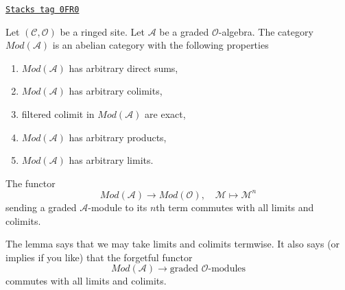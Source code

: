 \begin{lemma}[Gm abelian]
\label{sdga-lemma-gm-abelian}
\href{https://stacks.math.columbia.edu/tag/0FR0}{\texttt{Stacks tag 0FR0}}

Let $(\mathcal{C}, \mathcal{O})$ be a ringed site.
Let $\mathcal{A}$ be a graded $\mathcal{O}$-algebra.
The category $\textit{Mod}(\mathcal{A})$ is an abelian category
with the following properties
\begin{enumerate}
\item $\textit{Mod}(\mathcal{A})$ has arbitrary direct sums,
\item $\textit{Mod}(\mathcal{A})$ has arbitrary colimits,
\item filtered colimit in $\textit{Mod}(\mathcal{A})$ are exact,
\item $\textit{Mod}(\mathcal{A})$ has arbitrary products,
\item $\textit{Mod}(\mathcal{A})$ has arbitrary limits.
\end{enumerate}
The functor
$$
\textit{Mod}(\mathcal{A}) \longrightarrow \textit{Mod}(\mathcal{O}),\quad
\mathcal{M} \longmapsto \mathcal{M}^n
$$
sending a graded $\mathcal{A}$-module to its $n$th term commutes
with all limits and colimits.
\end{lemma}

The lemma says that we may take limits and colimits termwise. It
also says (or implies if you like) that the forgetful functor
$$
\textit{Mod}(\mathcal{A})
\longrightarrow
\text{graded }\mathcal{O}\text{-modules}
$$
commutes with all limits and colimits.

